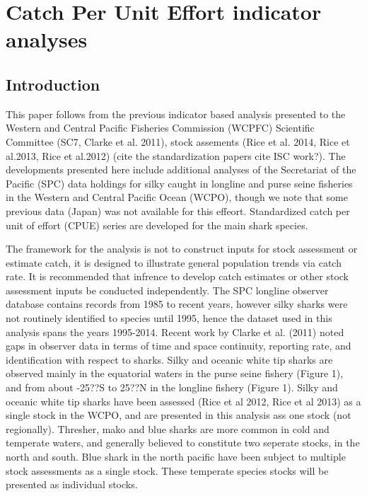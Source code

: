 \documentclass[12pt]{SCreport}
\begin{document}
      
 \clearpage          

\section{Catch Per Unit Effort indicator analyses}
      \subsection{Introduction}
      This paper follows from the previous indicator based analysis presented to the Western and Central Pacific Fisheries Commission (WCPFC) Scientific Committee (SC7, Clarke et al. 2011), stock assements (Rice et al. 2014, Rice et al.2013, Rice et al.2012)   (cite the standardization papers cite ISC work?). The developments presented here include additional analyses of the Secretariat of the Pacific (SPC) data holdings for silky caught in longline and purse seine fisheries in the Western and Central Pacific Ocean (WCPO), though we note that some previous data (Japan) was not available for this effeort. Standardized catch per unit of effort (CPUE) series are developed for the main shark species.  
      
The framework for the analysis is not  to construct inputs for stock assessment or estimate catch, it is designed to illustrate general population trends via   catch rate. It is recommended that infrence to develop catch estimates or other stock assessment inputs be conducted independently. The SPC longline observer database contains records from 1985 to recent years, however silky sharks were not routinely identified to species until 1995, hence the dataset used in this analysis spans the years 1995-2014. Recent work by Clarke et al. (2011) noted gaps in observer data in terms of time and  space continuity, reporting rate, and identification with respect to sharks. Silky and oceanic white tip sharks are observed mainly in the equatorial waters in the purse seine fishery (Figure 1), and from about -25??S to 25??N in the longline fishery (Figure 1). Silky and oceanic white tip sharks have been assessed (Rice et al 2012, Rice et al 2013) as a single stock in the WCPO, and are presented in this analysis ass one stock (not regionally).  Thresher, mako and blue sharks are more common in cold and temperate waters, and generally believed to constitute two seperate stocks, in the north and south. Blue shark in the north pacific have been subject to multiple stock assessments as a single stock.  These temperate species stocks will be presented as individual  stocks. 
\end{document}
